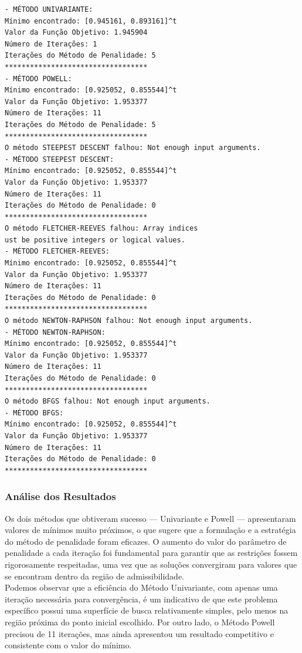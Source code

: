 \documentclass[a4paper, 12pt]{article}
\begin{document}
\begin{verbatim}
- MÉTODO UNIVARIANTE:
Mínimo encontrado: [0.945161, 0.893161]^t
Valor da Função Objetivo: 1.945904
Número de Iterações: 1
Iterações do Método de Penalidade: 5
**********************************
- MÉTODO POWELL:
Mínimo encontrado: [0.925052, 0.855544]^t
Valor da Função Objetivo: 1.953377
Número de Iterações: 11
Iterações do Método de Penalidade: 5
**********************************
O método STEEPEST DESCENT falhou: Not enough input arguments.
- MÉTODO STEEPEST DESCENT:
Mínimo encontrado: [0.925052, 0.855544]^t
Valor da Função Objetivo: 1.953377
Número de Iterações: 11
Iterações do Método de Penalidade: 0
**********************************
O método FLETCHER-REEVES falhou: Array indices 
ust be positive integers or logical values.
- MÉTODO FLETCHER-REEVES:
Mínimo encontrado: [0.925052, 0.855544]^t
Valor da Função Objetivo: 1.953377
Número de Iterações: 11
Iterações do Método de Penalidade: 0
**********************************
O método NEWTON-RAPHSON falhou: Not enough input arguments.
- MÉTODO NEWTON-RAPHSON:
Mínimo encontrado: [0.925052, 0.855544]^t
Valor da Função Objetivo: 1.953377
Número de Iterações: 11
Iterações do Método de Penalidade: 0
**********************************
O método BFGS falhou: Not enough input arguments.
- MÉTODO BFGS:
Mínimo encontrado: [0.925052, 0.855544]^t
Valor da Função Objetivo: 1.953377
Número de Iterações: 11
Iterações do Método de Penalidade: 0
**********************************
\end{verbatim}


\subsubsection{Análise dos Resultados}

Os dois métodos que obtiveram sucesso — Univariante e Powell — apresentaram valores de mínimos muito próximos, o que sugere que a formulação e a estratégia do método de penalidade foram eficazes. O aumento do valor do parâmetro de penalidade a cada iteração foi fundamental para garantir que as restrições fossem rigorosamente respeitadas, uma vez que as soluções convergiram para valores que se encontram dentro da região de admissibilidade.\\

Podemos observar que a eficiência do Método Univariante, com apenas uma iteração necessária para convergência, é um indicativo de que este problema específico possui uma superfície de busca relativamente simples, pelo menos na região próxima do ponto inicial escolhido. Por outro lado, o Método Powell precisou de 11 iterações, mas ainda apresentou um resultado competitivo e consistente com o valor do mínimo.\\
\end{document}
